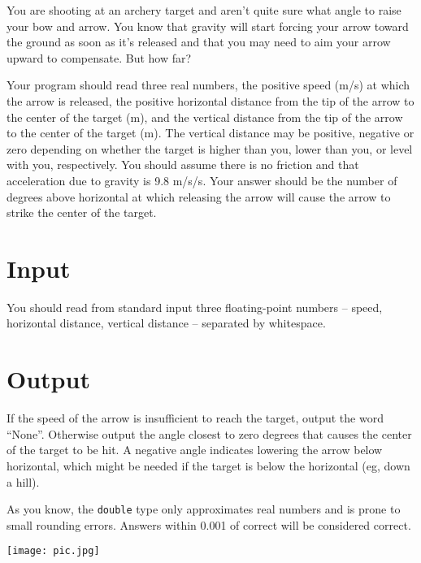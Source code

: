 



You are shooting at an archery target and aren't quite sure what angle to raise your bow and arrow. You know that gravity will start forcing your arrow toward the ground as soon as it's released and that you may need to aim your arrow upward to compensate. But how far?

Your program should read three real numbers, the positive speed (m/s) at which the arrow is released, the positive horizontal distance from the tip of the arrow to the center of the target (m), and the vertical distance from the tip of the arrow to the center of the target (m). The vertical distance may be positive, negative or zero depending on whether the target is higher than you, lower than you, or level with you, respectively. You should assume there is no friction and that acceleration due to gravity is 9.8 m/s/s. Your answer should be the number of degrees above horizontal at which releasing the arrow will cause the arrow to strike the center of the target.

\section*{Input}

You should read from standard input three floating-point numbers -- speed, horizontal distance, vertical distance -- separated by whitespace.

\section*{Output}

If the speed of the arrow is insufficient to reach the target, output the word ``None''. Otherwise output the angle closest to zero degrees that causes the center of the target to be hit. A negative angle indicates lowering the arrow below horizontal, which might be needed if the target is below the horizontal (eg, down a hill). 

As you know, the \texttt{double} type only approximates real numbers and is prone to small rounding errors. Answers within 0.001 of correct will be considered correct.


\hfill

\begin{center}
\texttt{[image: pic.jpg]}
\end{center}
